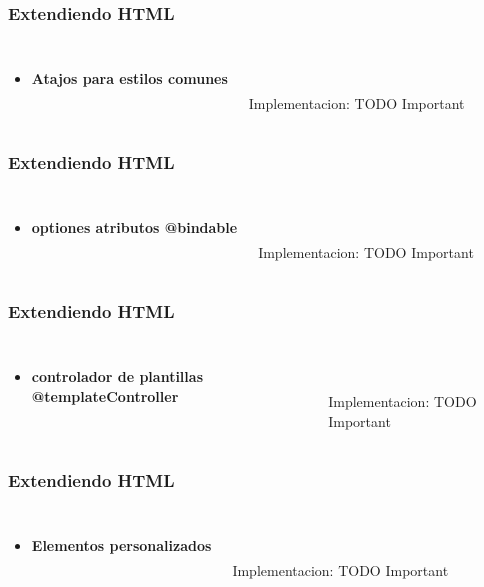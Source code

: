 \documentclass{beamer}
\begin{document}
\begin{frame}
\frametitle{Extendiendo HTML}
\begin{columns}[c]
\begin{itemize}
\item \textbf{Atajos para estilos comunes}
\end{itemize}

\\~\\
Implementacion: TODO Important
\end{columns}
\end{frame}
\begin{frame}
\frametitle{Extendiendo HTML}
\begin{columns}[c]
\begin{itemize}
\item \textbf{optiones atributos @bindable}
\end{itemize}

\\~\\
Implementacion: TODO Important
\end{columns}
\end{frame}
\begin{frame}
\frametitle{Extendiendo HTML}
\begin{columns}[c]
\begin{itemize}
\item \textbf{controlador de plantillas @templateController}
\end{itemize}

\\~\\
Implementacion: TODO Important
\end{columns}
\end{frame}
\begin{frame}
\frametitle{Extendiendo HTML}
\begin{columns}[c]
\begin{itemize}
\item \textbf{Elementos personalizados}
\end{itemize}

\\~\\
Implementacion: TODO Important
\end{columns}
\end{frame}
\end{document}
